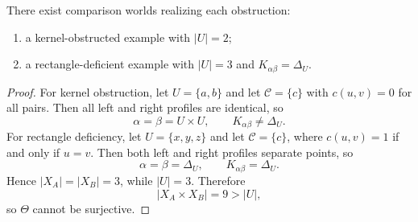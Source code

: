 \begin{proposition}
	There exist comparison worlds realizing each obstruction:
	\begin{enumerate}
		\item a kernel-obstructed example with \(|U|=2\);
		\item a rectangle-deficient example with \(|U|=3\) and \(K_{\alpha\beta}=\Delta_U\).
	\end{enumerate}
\end{proposition}
\begin{proof}
	For kernel obstruction, let \(U=\{a,b\}\) and let
	\(\mathcal C=\{c\}\) with \(c(u,v)=0\) for all pairs.
	Then all left and right profiles are identical, so
	\[
		\alpha=\beta=U\times U,
		\qquad
		K_{\alpha\beta}\neq\Delta_U.
	\]
	For rectangle deficiency, let \(U=\{x,y,z\}\) and let
	\(\mathcal C=\{c\}\), where \(c(u,v)=1\) if and only if \(u=v\).
	Then both left and right profiles separate points, so
	\[
		\alpha=\beta=\Delta_U,
		\qquad
		K_{\alpha\beta}=\Delta_U.
	\]
	Hence \(|X_A|=|X_B|=3\), while \(|U|=3\). Therefore
	\[
		|X_A\times X_B|=9>|U|,
	\]
	so \(\Theta\) cannot be surjective.
\end{proof}
